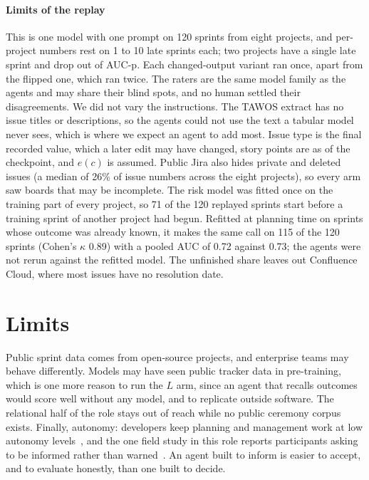 \documentclass[conference]{IEEEtran}
\begin{document}
\paragraph{Limits of the replay} This is one model with one prompt on 120 sprints from eight projects, and per-project numbers rest on 1 to 10 late sprints each; two projects have a single late sprint and drop out of AUC-p. Each changed-output variant ran once, apart from the flipped one, which ran twice. The raters are the same model family as the agents and may share their blind spots, and no human settled their disagreements. We did not vary the instructions. The TAWOS extract has no issue titles or descriptions, so the agents could not use the text a tabular model never sees, which is where we expect an agent to add most. Issue type is the final recorded value, which a later edit may have changed, story points are as of the checkpoint, and $e(c)$ is assumed. Public Jira also hides private and deleted issues (a median of 26\% of issue numbers across the eight projects), so every arm saw boards that may be incomplete. The risk model was fitted once on the training part of every project, so 71 of the 120 replayed sprints start before a training sprint of another project had begun. Refitted at planning time on sprints whose outcome was already known, it makes the same call on 115 of the 120 sprints (Cohen's $\kappa$ 0.89) with a pooled AUC of 0.72 against 0.73; the agents were not rerun against the refitted model. The unfinished share leaves out Confluence Cloud, where most issues have no resolution date.

\section{Limits}

Public sprint data comes from open-source projects, and enterprise teams may behave differently. Models may have seen public tracker data in pre-training, which is one more reason to run the $L$ arm, since an agent that recalls outcomes would score well without any model, and to replicate outside software. The relational half of the role stays out of reach while no public ceremony corpus exists. Finally, autonomy: developers keep planning and management work at low autonomy levels~\cite{choudhuri}, and the one field study in this role reports participants asking to be informed rather than warned~\cite{cabrero}. An agent built to inform is easier to accept, and to evaluate honestly, than one built to decide.
\end{document}
